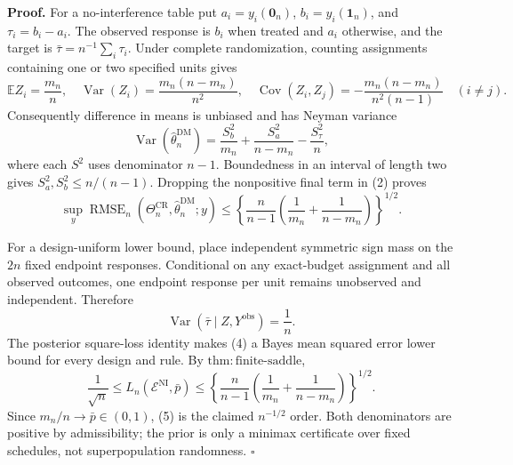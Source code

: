 \textbf{Proof.}
For a no-interference table put \(a_i=y_i(\mathbf 0_n)\), \(b_i=y_i(\mathbf 1_n)\), and \(\tau_i=b_i-a_i\). The observed response is \(b_i\) when treated and \(a_i\) otherwise, and the target is \(\bar\tau=n^{-1}\sum_i\tau_i\). Under complete randomization, counting assignments containing one or two specified units gives
\[
 \mathbb EZ_i=\frac{m_n}{n},\quad
 \operatorname{Var}(Z_i)=\frac{m_n(n-m_n)}{n^2},\quad
 \operatorname{Cov}(Z_i,Z_j)=-\frac{m_n(n-m_n)}{n^2(n-1)}\quad(i\ne j). \tag{1}
\]
Consequently difference in means is unbiased and has Neyman variance
\[
 \operatorname{Var}(\widehat\theta_n^{\mathrm{DM}})
 =\frac{S_b^2}{m_n}+\frac{S_a^2}{n-m_n}-\frac{S_\tau^2}{n}, \tag{2}
\]
where each \(S^2\) uses denominator \(n-1\). Boundedness in an interval of length two gives \(S_a^2,S_b^2\le n/(n-1)\). Dropping the nonpositive final term in (2) proves
\[
 \sup_y\operatorname{RMSE}_n(\Theta_n^{\mathrm{CR}},\widehat\theta_n^{\mathrm{DM}};y)
 \le\left\{\frac{n}{n-1}
 \left(\frac1{m_n}+\frac1{n-m_n}\right)\right\}^{1/2}. \tag{3}
\]

For a design-uniform lower bound, place independent symmetric sign mass on the \(2n\) fixed endpoint responses. Conditional on any exact-budget assignment and all observed outcomes, one endpoint response per unit remains unobserved and independent. Therefore
\[
 \operatorname{Var}(\bar\tau\mid Z,Y^{\mathrm{obs}})=\frac1n. \tag{4}
\]
The posterior square-loss identity makes (4) a Bayes mean squared error lower bound for every design and rule. By \(\mathrm{thm{:}finite\text{-}saddle}\),
\[
 \frac1{\sqrt n}\le L_n(\mathcal E^{\mathrm{NI}},\bar p)
 \le\left\{\frac{n}{n-1}
 \left(\frac1{m_n}+\frac1{n-m_n}\right)\right\}^{1/2}. \tag{5}
\]
Since \(m_n/n\to\bar p\in(0,1)\), (5) is the claimed \(n^{-1/2}\) order. Both denominators are positive by admissibility; the prior is only a minimax certificate over fixed schedules, not superpopulation randomness. \(\square\)